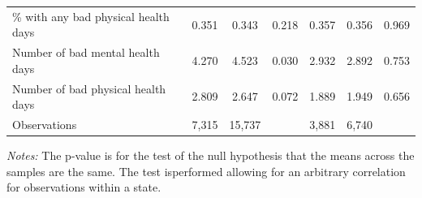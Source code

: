 \begin{table}[htbp]
{\begin{tabular}{lcccccc}
\% with any bad physical health days & 0.351 & 0.343 & 0.218 & 0.357 & 0.356 & 0.969 \\
Number of bad mental health days & 4.270 & 4.523 & 0.030 & 2.932 & 2.892 & 0.753 \\
Number of bad physical health days & 2.809 & 2.647 & 0.072 & 1.889 & 1.949 & 0.656 \\
\midrule
Observations & 7,315 & 15,737 & & 3,881 & 6,740 & \\
\bottomrule
\end{tabular}}
\begin{minipage}{\linewidth}
\smallskip\footnotesize
\textit{Notes:} The p-value is for the test of the null hypothesis that the means across the samples are the same. The test isperformed allowing for an arbitrary correlation for observations within a state.
\end{minipage}
\end{table}
